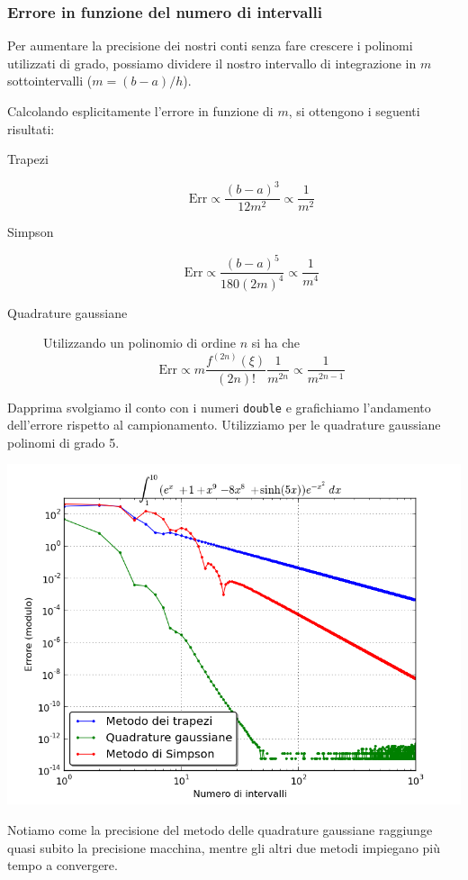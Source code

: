 \documentclass[a4paper,10pt]{article}
\begin{document}
\subsubsection{Errore in funzione del numero di intervalli}
Per aumentare la precisione dei nostri conti senza fare crescere i polinomi utilizzati di grado, possiamo dividere il nostro intervallo di integrazione in $m$ sottointervalli ($m = (b-a)/h$).

Calcolando esplicitamente l'errore in funzione di $m$, si ottengono i seguenti risultati:
\begin{description}
\item[Trapezi] $$\text{Err} \propto \frac{(b-a)^3}{12m^2}\propto\frac{1}{m^2}$$
\item[Simpson] $$\text{Err} \propto \frac{(b-a)^5}{180(2m)^4} \propto\frac{1}{m^4}$$
\item[Quadrature gaussiane] Utilizzando un polinomio di ordine $n$ si ha che $$\text{Err} \propto m\frac{f^{(2n)}(\xi)}{(2n)!}\frac{1}{m^{2n}} \propto\frac{1}{m^{2n-1}}$$
\end{description}

Dapprima svolgiamo il conto con i numeri \texttt{double} e grafichiamo l'andamento dell'errore rispetto al campionamento. Utilizziamo per le quadrature gaussiane polinomi di grado 5.
\begin{center}
\includegraphics[scale=0.5]{../images/integrali/integralisommaprecisa.png}
\end{center}
Notiamo come la precisione del metodo delle quadrature gaussiane raggiunge quasi subito la precisione macchina, mentre gli altri due metodi impiegano più tempo a convergere.
\end{document}
